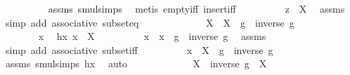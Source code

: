 \begin{isabellebody}
\ \ \ \ \ \ \ \ \isamarkupfalse%
\ assms\ smul{\isachardot}{\kern0pt}simps\ \isamarkupfalse%
\ {\isacharparenleft}{\kern0pt}metis\ empty{\isacharunderscore}{\kern0pt}iff\ insert{\isacharunderscore}{\kern0pt}iff{\isacharparenright}{\kern0pt}\isanewline
\ \ \ \ \ \ \isamarkupfalse%
\ \isamarkupfalse%
\ {\isachardoublequoteopen}z\ {\isasymin}\ X{\isachardoublequoteclose}\ \isamarkupfalse%
\ assms\ \isamarkupfalse%
\ {\isacharparenleft}{\kern0pt}simp\ add{\isacharcolon}{\kern0pt}\ associative\ subset{\isacharunderscore}{\kern0pt}eq{\isacharparenright}{\kern0pt}\isanewline
\ \ \ \ \isamarkupfalse%
\isanewline
\ \ \isamarkupfalse%
\isanewline
\ \ \ \ \isamarkupfalse%
\ {\isachardoublequoteopen}X\ {\isasymsubseteq}\ {\isacharparenleft}{\kern0pt}X\ {\isasymcdots}\ {\isacharbraceleft}{\kern0pt}g{\isacharbraceright}{\kern0pt}{\isacharparenright}{\kern0pt}\ {\isasymcdots}\ {\isacharbraceleft}{\kern0pt}inverse\ g{\isacharbraceright}{\kern0pt}{\isachardoublequoteclose}\ \isanewline
\ \ \ \ \isamarkupfalse%
\isanewline
\ \ \ \ \ \ \isamarkupfalse%
\ x\ \isamarkupfalse%
\ hx{\isacharcolon}{\kern0pt}\ {\isachardoublequoteopen}x\ {\isasymin}\ X{\isachardoublequoteclose}\isanewline
\ \ \ \ \ \ \isamarkupfalse%
\ \isamarkupfalse%
\ {\isachardoublequoteopen}x\ {\isacharequal}{\kern0pt}\ x\ {\isasymcdot}\ g\ {\isasymcdot}\ inverse\ g{\isachardoublequoteclose}\ \isamarkupfalse%
\ assms\ \isamarkupfalse%
\ {\isacharparenleft}{\kern0pt}simp\ add{\isacharcolon}{\kern0pt}\ associative\ subset{\isacharunderscore}{\kern0pt}iff{\isacharparenright}{\kern0pt}\isanewline
\ \ \ \ \ \ \isamarkupfalse%
\ \isamarkupfalse%
\ {\isachardoublequoteopen}x\ {\isasymin}\ {\isacharparenleft}{\kern0pt}X\ {\isasymcdots}\ {\isacharbraceleft}{\kern0pt}g{\isacharbraceright}{\kern0pt}{\isacharparenright}{\kern0pt}\ {\isasymcdots}\ {\isacharbraceleft}{\kern0pt}inverse\ g{\isacharbraceright}{\kern0pt}{\isachardoublequoteclose}\ \isamarkupfalse%
\ assms\ smul{\isachardot}{\kern0pt}simps\ hx\ \isamarkupfalse%
\ auto\isanewline
\ \ \ \ \isamarkupfalse%
\isanewline
\ \ \isamarkupfalse%
\isanewline
\ \ \isamarkupfalse%
\ \isamarkupfalse%
\ {\isachardoublequoteopen}X\ {\isasymcdots}\ {\isacharbraceleft}{\kern0pt}inverse\ g{\isacharbraceright}{\kern0pt}\ {\isacharequal}{\kern0pt}\ X{\isachardoublequoteclose}\ \isamarkupfalse%

\end{isabellebody}
